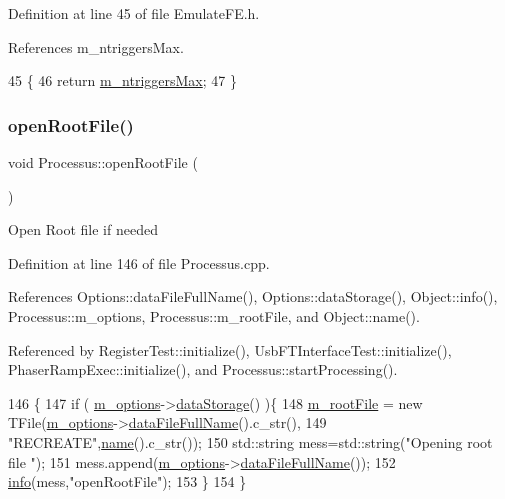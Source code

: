 Definition at line 45 of file Emulate\+F\+E.\+h.



References m\+\_\+ntriggers\+Max.


\begin{DoxyCode}
45                  \{
46     \textcolor{keywordflow}{return} \hyperlink{classEmulateFE_a2d473d12faf30f4870458874d70c7f55}{m\_ntriggersMax};
47   \}
\end{DoxyCode}
\mbox{\label{classProcessus_aacf6812880c1d1a2bf14a4a39458f443}} 
\subsubsection{\texorpdfstring{open\+Root\+File()}{openRootFile()}}
{\footnotesize\ttfamily void Processus\+::open\+Root\+File (\begin{DoxyParamCaption}{ }\end{DoxyParamCaption})\hspace{0.3cm}{\ttfamily [inherited]}}

Open Root file if needed 

Definition at line 146 of file Processus.\+cpp.



References Options\+::data\+File\+Full\+Name(), Options\+::data\+Storage(), Object\+::info(), Processus\+::m\+\_\+options, Processus\+::m\+\_\+root\+File, and Object\+::name().



Referenced by Register\+Test\+::initialize(), Usb\+F\+T\+Interface\+Test\+::initialize(), Phaser\+Ramp\+Exec\+::initialize(), and Processus\+::start\+Processing().


\begin{DoxyCode}
146                                \{
147   \textcolor{keywordflow}{if} ( \hyperlink{classProcessus_a74205f3c1e00c4448f7b3257c2351797}{m\_options}->\hyperlink{classOptions_aed7799d10139fa542055b982cb820192}{dataStorage}() )\{
148     \hyperlink{classProcessus_a76114f8cf2111e910c323a7ae05a015d}{m\_rootFile} = \textcolor{keyword}{new} TFile(\hyperlink{classProcessus_a74205f3c1e00c4448f7b3257c2351797}{m\_options}->\hyperlink{classOptions_ab1cd9f237e9c18fd72323c74565453f8}{dataFileFullName}().c\_str(),
149                            \textcolor{stringliteral}{"RECREATE"},\hyperlink{classObject_a300f4c05dd468c7bb8b3c968868443c1}{name}().c\_str());
150         std::string mess=std::string(\textcolor{stringliteral}{"Opening root file "});
151         mess.append(\hyperlink{classProcessus_a74205f3c1e00c4448f7b3257c2351797}{m\_options}->\hyperlink{classOptions_ab1cd9f237e9c18fd72323c74565453f8}{dataFileFullName}());
152         \hyperlink{classObject_a644fd329ea4cb85f54fa6846484b84a8}{info}(mess,\textcolor{stringliteral}{"openRootFile"});
153   \}
154 \}
\end{DoxyCode}
\mbox{\label{classEmulateFE_a8442db97da7b2a97fe97745e6d8d9161}} 
